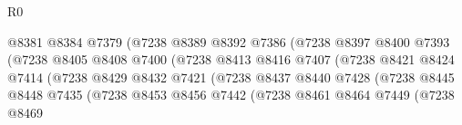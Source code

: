 \begin{lexlean}{R0}
\begin{coremodule}
                                          @8381
                                          @8384
                                          @7379
                                          (@7238
                                            @8389
                                            @8392
                                            @7386
                                            (@7238
                                              @8397
                                              @8400
                                              @7393
                                              (@7238
                                                @8405
                                                @8408
                                                @7400
                                                (@7238
                                                  @8413
                                                  @8416
                                                  @7407
                                                  (@7238
                                                    @8421
                                                    @8424
                                                    @7414
                                                    (@7238
                                                      @8429
                                                      @8432
                                                      @7421
                                                      (@7238
                                                        @8437
                                                        @8440
                                                        @7428
                                                        (@7238
                                                          @8445
                                                          @8448
                                                          @7435
                                                          (@7238
                                                            @8453
                                                            @8456
                                                            @7442
                                                            (@7238
                                                              @8461
                                                              @8464
                                                              @7449
                                                              (@7238
                                                                @8469

\end{coremodule}
\end{lexlean}
